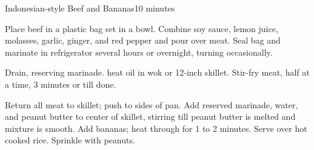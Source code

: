 \begin{recipe}{Indonesian-style Beef and Bananas}{10 minutes}{}

Place beef in a plastic bag set in a bowl.
Combine soy sauce, lemon juice, molasses, garlic, ginger, and red pepper and pour over meat.
Seal bag and marinate in refrigerator several hours or overnight, turning occasionally.



Drain, reserving marinade. heat oil in wok or 12-inch skillet.
Stir-fry meat, half at a time, 3 minutes or till done. 


Return all meat to skillet; push to sides of pan.
Add reserved marinade, water, and peanut butter to center of skillet, stirring till peanut butter is melted and mixture is smooth.
Add bananas; heat through for 1 to 2 minutes.
Serve over hot cooked rice. Sprinkle with peanuts. 

\end{recipe}
